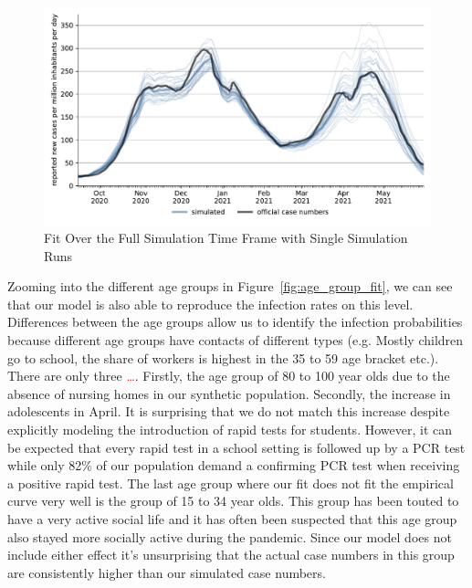 \begin{figure}[ht]   %
  \centering
  \includegraphics[width=\textwidth]{figures/results/figures/scenario_comparisons/combined_fit/full_new_known_case_with_single_runs}
  \caption{Fit Over the Full Simulation Time Frame with Single Simulation Runs}
  \label{fig:aggregated_fit2}
\end{figure}

Zooming into the different age groups in Figure~\ref{fig:age_group_fit}, we can see that
our model is also able to reproduce the infection rates on this level. Differences
between the age groups allow us to identify the infection probabilities because different
age groups have contacts of different types (e.g. Mostly children go to school, the share
of workers is highest in the 35 to 59 age bracket etc.). There are only three
\textcolor{red}{\ldots}. Firstly, the age group of 80 to 100 year olds due to the absence
of nursing homes in our synthetic population. Secondly, the increase in adolescents in
April. It is surprising that we do not match this increase despite explicitly modeling
the introduction of rapid tests for students. However, it can be expected that every
rapid test in a school setting is followed up by a PCR test while only 82\% of our
population \citep{Betsch2021} demand a confirming PCR test when receiving a positive
rapid test. The last age group where our fit does not fit the empirical curve very well
is the group of 15 to 34 year olds. This group has been touted to have a very active
social life and it has often been suspected that this age group also stayed more socially
active during the pandemic. Since our model does not include either effect it's
unsurprising that the actual case numbers in this group are consistently higher than our
simulated case numbers.

